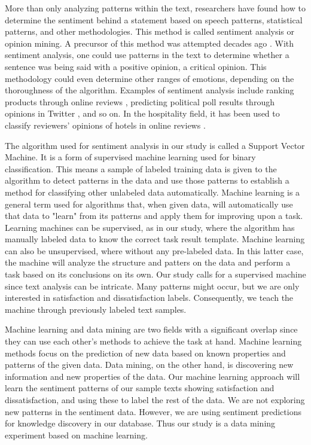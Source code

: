\documentclass[smallextended,natbib]{svjour3}       %
\begin{document}
More than only analyzing patterns within the text, researchers have found how to determine the sentiment behind a statement based on speech patterns, statistical patterns, and other methodologies. This method is called sentiment analysis or opinion mining. A precursor of this method was attempted decades ago \cite[][]{stone1966general}. With sentiment analysis, one could use patterns in the text to determine whether a sentence was being said with a positive opinion, a critical opinion. This methodology could even determine other ranges of emotions, depending on the thoroughness of the algorithm. Examples of sentiment analysis include ranking products through online reviews \cite[e.g][]{liu2017149, zhang2011}, predicting political poll results through opinions in Twitter \cite[][]{oconnor2010}, and so on. In the hospitality field, it has been used to classify reviewers' opinions of hotels in online reviews \cite[e.g.]{kim2017362, alsmadi2018}. 

The algorithm used for sentiment analysis in our study is called a Support Vector Machine. It is a form of supervised machine learning used for binary classification. This means a sample of labeled training data is given to the algorithm to detect patterns in the data and use those patterns to establish a method for classifying other unlabeled data automatically. Machine learning is a general term used for algorithms that, when given data, will automatically use that data to "learn" from its patterns and apply them for improving upon a task. Learning machines can be supervised, as in our study, where the algorithm has manually labeled data to know the correct task result template. Machine learning can also be unsupervised, where without any pre-labeled data. In this latter case, the machine will analyze the structure and patters on the data and perform a task based on its conclusions on its own. Our study calls for a supervised machine since text analysis can be intricate. Many patterns might occur, but we are only interested in satisfaction and dissatisfaction labels. Consequently, we teach the machine through previously labeled text samples. 

Machine learning and data mining are two fields with a significant overlap since they can use each other's methods to achieve the task at hand. Machine learning methods focus on the prediction of new data based on known properties and patterns of the given data. Data mining, on the other hand, is discovering new information and new properties of the data. Our machine learning approach will learn the sentiment patterns of our sample texts showing satisfaction and dissatisfaction, and using these to label the rest of the data. We are not exploring new patterns in the sentiment data. However, we are using sentiment predictions for knowledge discovery in our database. Thus our study is a data mining experiment based on machine learning.
\end{document}
